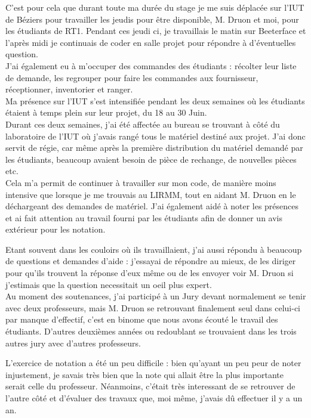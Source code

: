 \documentclass[11pt,french,a4paper]{report}
\begin{document}
C'est pour cela que durant toute ma durée du stage je me suis déplacée sur l'IUT de Béziers pour travailler les jeudis pour être
disponible, M. Druon et moi, pour les étudiants de RT1. Pendant ces jeudi ci, je travaillais le matin sur Beeterface et 
l'après midi je continuais de coder en salle projet pour répondre à d'éventuelles question. \\

J'ai également eu à m'occuper des commandes des étudiants : récolter leur liste de demande, les regrouper pour faire les commandes
aux fournisseur, réceptionner, inventorier et ranger. \\

Ma présence sur l'IUT s'est intensifiée pendant les deux semaines où les étudiants étaient à temps plein sur leur projet, du 18 au 30 Juin. \\

Durant ces deux semaines, j'ai été affectée au bureau se trouvant à côté du laboratoire de l'IUT où j'avais rangé tous le matériel 
destiné aux projet.
J'ai donc servit de régie, car même après la première distribution du matériel demandé par les étudiants, beaucoup avaient 
besoin de pièce de rechange, de nouvelles pièces etc. \\

Cela m'a permit de continuer à travailler sur mon code, de manière moins intensive que lorsque je me trouvais au LIRMM, tout en
aidant M. Druon en le déchargeant des demandes de matériel. 
J'ai également aidé à noter les présences et ai fait attention au travail fourni par les étudiants afin de donner un avis extérieur pour
les notation.

Etant souvent dans les couloirs où ils travaillaient, j'ai aussi répondu à beaucoup de questions et demandes d'aide : 
j'essayai de répondre au mieux, de les diriger pour qu'ils trouvent la réponse d'eux même ou de les envoyer voir M. Druon si 
j'estimais que la question necessitait un oeil plus expert. \\

Au moment des soutenances, j'ai participé à un Jury devant normalement se tenir avec deux professeurs, mais M. Druon se retrouvant 
finalement seul dans celui-ci par manque d'effectif, c'est en binome que nous avons écouté le travail des étudiants.
D'autres deuxièmes années ou redoublant se trouvaient dans les trois autres jury avec d'autres professeurs. 

L'exercice de notation a été un peu difficile : bien qu'ayant un peu peur de noter injustement,
je savais très bien que la note qui allait être la plus importante serait celle 
du professeur. Néanmoins, c'était très interessant de se retrouver de l'autre côté et d'évaluer des travaux que, moi même, 
j'avais dû effectuer il y a un an. \\
\end{document}
